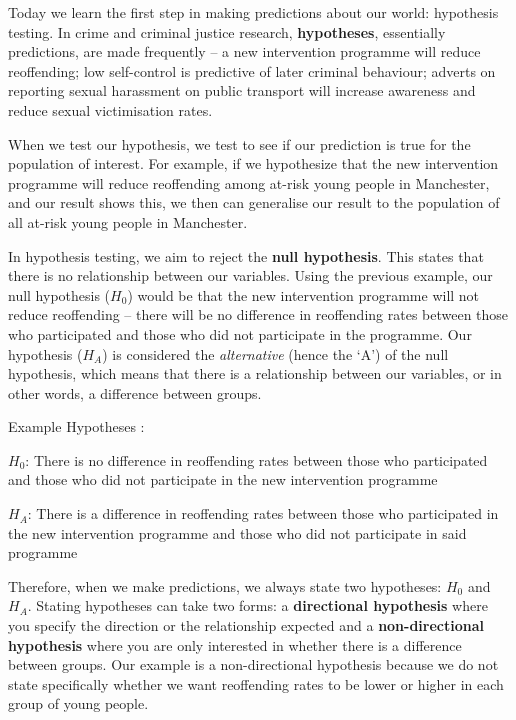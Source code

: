 \documentclass[
]{book}
\begin{document}
Today we learn the first step in making predictions about our world: hypothesis testing. In crime and criminal justice research, \textbf{hypotheses}, essentially predictions, are made frequently -- a new intervention programme will reduce reoffending; low self-control is predictive of later criminal behaviour; adverts on reporting sexual harassment on public transport will increase awareness and reduce sexual victimisation rates.

When we test our hypothesis, we test to see if our prediction is true for the population of interest. For example, if we hypothesize that the new intervention programme will reduce reoffending among at-risk young people in Manchester, and our result shows this, we then can generalise our result to the population of all at-risk young people in Manchester.

In hypothesis testing, we aim to reject the \textbf{null hypothesis}. This states that there is no relationship between our variables. Using the previous example, our null hypothesis (\(H_0\)) would be that the new intervention programme will not reduce reoffending -- there will be no difference in reoffending rates between those who participated and those who did not participate in the programme. Our hypothesis (\(H_A\)) is considered the \emph{alternative} (hence the `A') of the null hypothesis, which means that there is a relationship between our variables, or in other words, a difference between groups.

Example Hypotheses :

\(H_0\): There is no difference in reoffending rates between those who participated and those who did not participate in the new intervention programme

\(H_A\): There is a difference in reoffending rates between those who participated in the new intervention programme and those who did not participate in said programme

Therefore, when we make predictions, we always state two hypotheses: \(H_0\) and \(H_A\). Stating hypotheses can take two forms: a \textbf{directional hypothesis} where you specify the direction or the relationship expected and a \textbf{non-directional hypothesis} where you are only interested in whether there is a difference between groups. Our example is a non-directional hypothesis because we do not state specifically whether we want reoffending rates to be lower or higher in each group of young people.
\end{document}
